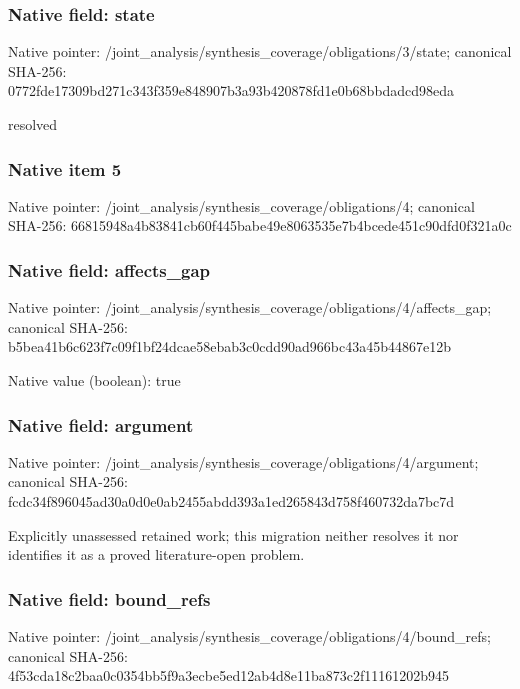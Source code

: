 \documentclass[10pt,a4paper]{article}
\begin{document}
\subsubsection{Native field: state}
Native pointer: /joint\_\allowbreak{}analysis/synthesis\_\allowbreak{}coverage/obligations/3/state; canonical SHA-256: 0772fde17309bd271c343f359e848907b3a93b420878fd1e0b68bbdadcd98eda

\begingroup\raggedright\sloppy resolved\par\endgroup

\subsubsection{Native item 5}
Native pointer: /joint\_\allowbreak{}analysis/synthesis\_\allowbreak{}coverage/obligations/4; canonical SHA-256: 66815948a4b83841cb60f445babe49e8063535e7b4bcede451c90dfd0f321a0c

\subsubsection{Native field: affects\_\allowbreak{}gap}
Native pointer: /joint\_\allowbreak{}analysis/synthesis\_\allowbreak{}coverage/obligations/4/affects\_\allowbreak{}gap; canonical SHA-256: b5bea41b6c623f7c09f1bf24dcae58ebab3c0cdd90ad966bc43a45b44867e12b

Native value (boolean): true

\subsubsection{Native field: argument}
Native pointer: /joint\_\allowbreak{}analysis/synthesis\_\allowbreak{}coverage/obligations/4/argument; canonical SHA-256: fcdc34f896045ad30a0d0e0ab2455abdd393a1ed265843d758f460732da7bc7d

\begingroup\raggedright\sloppy Explicitly unassessed retained work;\allowbreak{} this migration neither resolves it nor identifies it as a proved literature-open problem.\par\endgroup

\subsubsection{Native field: bound\_\allowbreak{}refs}
Native pointer: /joint\_\allowbreak{}analysis/synthesis\_\allowbreak{}coverage/obligations/4/bound\_\allowbreak{}refs; canonical SHA-256: 4f53cda18c2baa0c0354bb5f9a3ecbe5ed12ab4d8e11ba873c2f11161202b945
\end{document}
